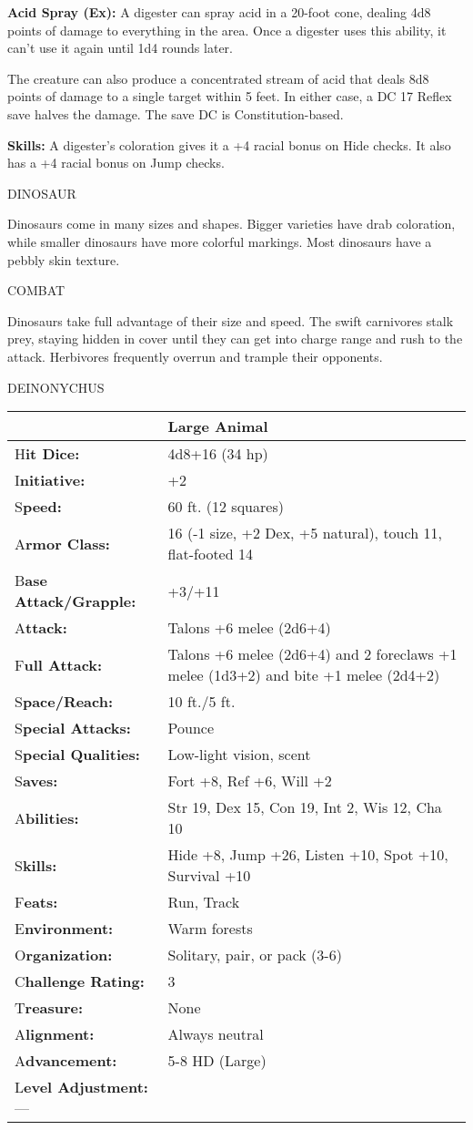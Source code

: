 \documentclass{article}
\begin{document}
\textbf{Acid Spray (Ex): }A digester can spray acid in a 20-foot cone, dealing 
4d8 points of damage to everything in the area. Once a digester uses this ability, 
it can't use it again until 1d4 rounds later.

The creature can also produce a concentrated stream of acid that deals 8d8 points 
of damage to a single target within 5 feet. In either case, a DC 17 Reflex save 
halves the damage. The save DC is Constitution-based.

\textbf{Skills:} A digester's coloration gives it a +4 racial bonus on Hide checks. 
It also has a +4 racial bonus on Jump checks.

\vspace{12pt}
{\LARGE{}DINOSAUR}

Dinosaurs come in many sizes and shapes. Bigger varieties have drab coloration, 
while smaller dinosaurs have more colorful markings. Most dinosaurs have a pebbly 
skin texture.

COMBAT

Dinosaurs take full advantage of their size and speed. The swift carnivores stalk 
prey, staying hidden in cover until they can get into charge range and rush to 
the attack. Herbivores frequently overrun and trample their opponents.

DEINONYCHUS

\begin{tabular}{|>{\raggedright}p{91pt}|>{\raggedright}p{227pt}|}
\hline
  & Large Animal\tabularnewline
\hline
H\textbf{it Dice:} & 4d8+16 (34 hp)\tabularnewline
\hline
I\textbf{nitiative:} & +2\tabularnewline
\hline
S\textbf{peed:} & 60 ft. (12 squares)\tabularnewline
\hline
A\textbf{rmor Class:} & 16 (-1 size, +2 Dex, +5 natural), touch 11, flat-footed 
14\tabularnewline
\hline
B\textbf{ase Attack/Grapple:} & +3/+11\tabularnewline
\hline
A\textbf{ttack:} & Talons +6 melee (2d6+4)\tabularnewline
\hline
F\textbf{ull Attack:} & Talons +6 melee (2d6+4) and 2 foreclaws +1 melee (1d3+2) 
and bite +1 melee (2d4+2)\tabularnewline
\hline
S\textbf{pace/Reach:} & 10 ft./5 ft.\tabularnewline
\hline
S\textbf{pecial Attacks:} & Pounce\tabularnewline
\hline
S\textbf{pecial Qualities:} & Low-light vision, scent\tabularnewline
\hline
S\textbf{aves:} & Fort +8, Ref +6, Will +2\tabularnewline
\hline
A\textbf{bilities:} & Str 19, Dex 15, Con 19, Int 2, Wis 12, Cha 10\tabularnewline
\hline
S\textbf{kills:} & Hide +8, Jump +26, Listen +10, Spot +10, Survival +10\tabularnewline
\hline
F\textbf{eats:} & Run, Track\tabularnewline
\hline
E\textbf{nvironment:} & Warm forests\tabularnewline
\hline
O\textbf{rganization:} & Solitary, pair, or pack (3-6)\tabularnewline
\hline
C\textbf{hallenge Rating:} & 3\tabularnewline
\hline
T\textbf{reasure:} & None\tabularnewline
\hline
A\textbf{lignment:} & Always neutral\tabularnewline
\hline
A\textbf{dvancement:} & 5-8 HD (Large)\tabularnewline
\hline
L\textbf{evel Adjustment:}--- & \tabularnewline
\hline
\end{tabular}
\end{document}

